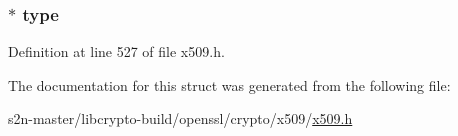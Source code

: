 \subsubsection[{\texorpdfstring{type}{type}}]{ $\ast$ type}\hypertarget{struct_netscape__certificate__sequence_a208650820ad37e29d3433d9f20665c28}{}\label{struct_netscape__certificate__sequence_a208650820ad37e29d3433d9f20665c28}


Definition at line 527 of file x509.\+h.



The documentation for this struct was generated from the following file\+:\begin{DoxyCompactItemize}
\item 
s2n-\/master/libcrypto-\/build/openssl/crypto/x509/\hyperlink{crypto_2x509_2x509_8h}{x509.\+h}\end{DoxyCompactItemize}
